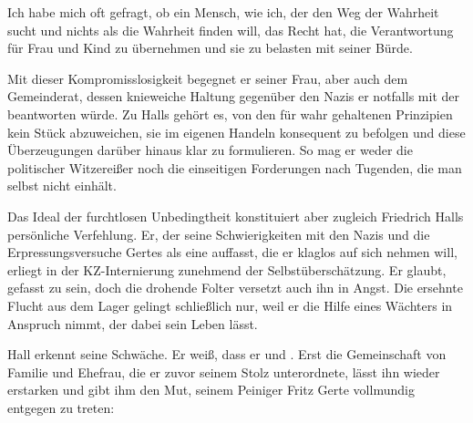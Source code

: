 \begin{BlockQuote}
  Ich habe mich oft gefragt, ob ein Mensch, wie ich, der den Weg der Wahrheit
  sucht und nichts als die Wahrheit finden will, das Recht hat, die
  Verantwortung für Frau und Kind zu übernehmen und sie zu belasten mit seiner
  Bürde. 
\end{BlockQuote}
Mit dieser Kompromisslosigkeit begegnet er seiner Frau, aber auch dem
Gemeinderat, dessen knieweiche Haltung gegenüber den Nazis er notfalls mit der
\Cite{Vertrauensfrage}  beantworten würde. Zu Halls
\Cite{Weg der Wahrheit}
gehört es, von den für wahr gehaltenen Prinzipien kein Stück abzuweichen, sie
im eigenen Handeln konsequent zu befolgen und diese Überzeugungen darüber
hinaus klar zu formulieren. So mag er weder die \Cite{billigen Ausflüchte}
politischer Witzereißer  noch die einseitigen Forderungen
nach Tugenden, die man selbst nicht einhält. 

Das  Ideal der furchtlosen Unbedingtheit konstituiert aber
zugleich Friedrich Halls persönliche Verfehlung. Er, der seine Schwierigkeiten
mit den Nazis und die Erpressungsversuche Gertes als eine \Cite{Prüfung}
 auffasst,
die er klaglos auf sich nehmen will, erliegt in der KZ-Internierung zunehmend
der Selbstüberschätzung. Er glaubt, \Cite{auf das Schlimmste}
 gefasst zu sein,
doch die drohende Folter versetzt auch ihn in Angst. Die ersehnte Flucht aus
dem Lager gelingt schließlich nur, weil er die Hilfe eines Wächters in Anspruch 
nimmt, der dabei sein Leben lässt.

Hall erkennt seine Schwäche. Er weiß, dass er \Cite{stolz war}
 und \Cite{versagt hat} . Erst die
Gemeinschaft von Familie und Ehefrau, die er zuvor seinem Stolz unterordnete,
lässt ihn wieder erstarken und gibt ihm den Mut, seinem Peiniger Fritz Gerte 
vollmundig entgegen zu treten:

